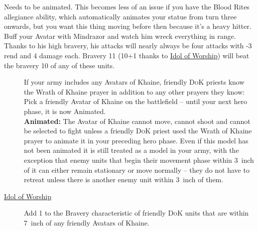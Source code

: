 \newpage %

Needs to be animated. This becomes less of an issue if you have the Blood Rites
allegiance ability, which automatically animates your statue from turn three
onwards, but you want this thing moving before then because it's a heavy
hitter.\\ 
Buff your Avatar with Mindrazor and watch him wreck everything in
range. Thanks to his high bravery, his attacks will nearly always be four
attacks with -3 rend and 4 damage each. Bravery 11 (10+1 thanks to
\hyperref[idol-of-worship]{Idol of Worship}) will beat the bravery 10 of any of
these units.

\begin{description}
    \item [] If your army includes
        any Avatars of Khaine, friendly \textsc{DoK} priests know the Wrath of Khaine
        prayer in addition to any other prayers they know:  Pick a friendly
        Avatar of Khaine on the battlefield – until your next hero phase, it is
        now Animated. \\
        \textbf{Animated:} The Avatar of Khaine cannot move, cannot shoot
        and cannot be selected to fight unless a friendly \textsc{DoK}
        priest used the Wrath of Khaine prayer to animate it in your preceding
        hero phase. Even if this model has not been animated it is still
        treated as a model in your army, with the exception that enemy units
        that begin their movement phase within 3~inch of it can either remain
        stationary or move normally -- they do not have to retreat unless there
        is another enemy unit within 3~inch of them.
    \item [{\hyperref[idol-of-worship]{Idol of Worship}}] Add 1 to the Bravery
        characteristic of friendly \textsc{DoK} units that are within 7~inch of any
        friendly Avatars of Khaine.
\end{description}

